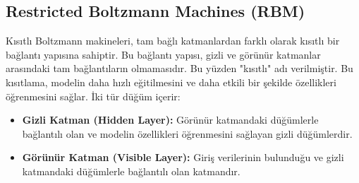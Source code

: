 \subsection{Restricted Boltzmann Machines (RBM)}
Kısıtlı Boltzmann makineleri, tam bağlı katmanlardan farklı olarak kısıtlı bir bağlantı yapısına sahiptir. Bu bağlantı yapısı, gizli ve görünür katmanlar arasındaki tam bağlantıların olmamasıdır. Bu yüzden "kısıtlı" adı verilmiştir. Bu kısıtlama, modelin daha hızlı eğitilmesini ve daha etkili bir şekilde özellikleri öğrenmesini sağlar. İki tür düğüm içerir:
\begin{itemize}
    \item \textbf{Gizli Katman (Hidden Layer):} Görünür katmandaki düğümlerle bağlantılı olan ve modelin özellikleri öğrenmesini sağlayan gizli düğümlerdir.
    \item \textbf{Görünür Katman (Visible Layer):} Giriş verilerinin bulunduğu ve gizli katmandaki düğümlerle bağlantılı olan katmandır.
\end{itemize}

\newpage